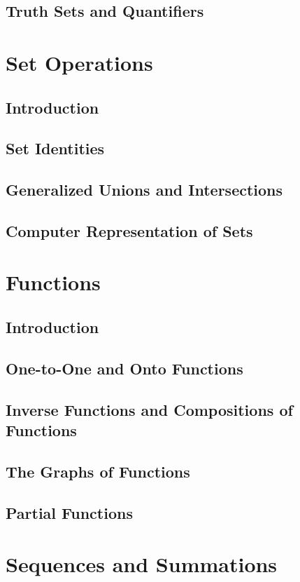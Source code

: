 \documentclass[11pt]{book}
\begin{document}
  \subsection{Truth Sets and Quantifiers}
  
 \section{Set Operations}
  \subsection{Introduction}
  \subsection{Set Identities}
  \subsection{Generalized Unions and Intersections}
  \subsection{Computer Representation of Sets}
 
 \section{Functions}
  \subsection{Introduction}
  \subsection{One-to-One and Onto Functions}
  \subsection{Inverse Functions and Compositions of Functions}
  \subsection{The Graphs of Functions}
  \subsection{Partial Functions}
  
 \section{Sequences and Summations}
\end{document}
